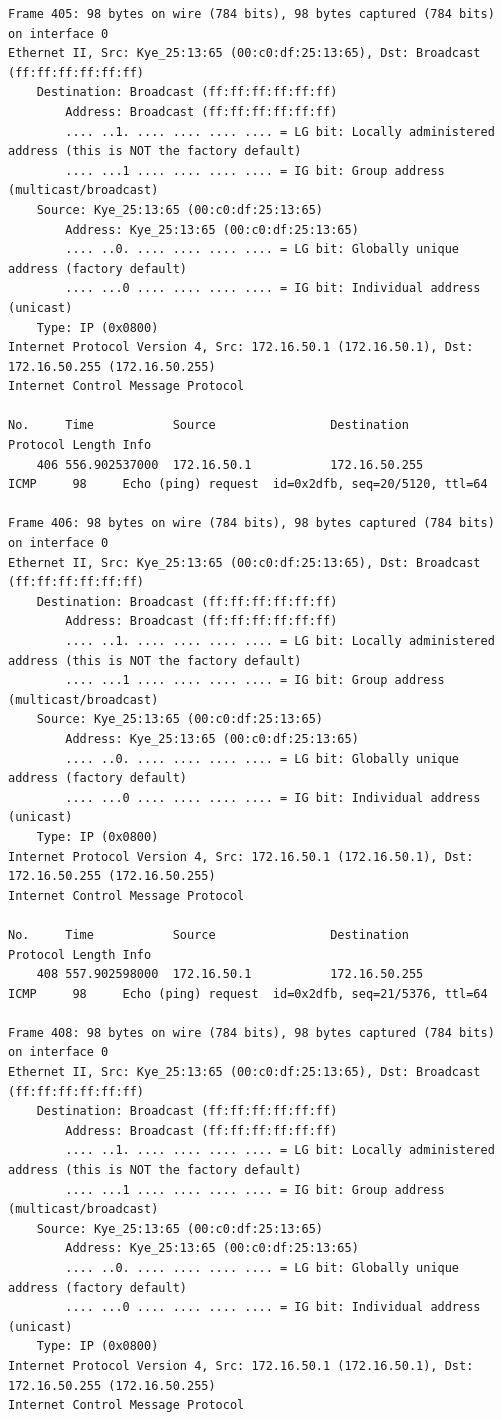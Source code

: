 \documentclass[a4paper,11pt]{article}
\begin{document}
\begin{lstlisting}
Frame 405: 98 bytes on wire (784 bits), 98 bytes captured (784 bits) on interface 0
Ethernet II, Src: Kye_25:13:65 (00:c0:df:25:13:65), Dst: Broadcast (ff:ff:ff:ff:ff:ff)
    Destination: Broadcast (ff:ff:ff:ff:ff:ff)
        Address: Broadcast (ff:ff:ff:ff:ff:ff)
        .... ..1. .... .... .... .... = LG bit: Locally administered address (this is NOT the factory default)
        .... ...1 .... .... .... .... = IG bit: Group address (multicast/broadcast)
    Source: Kye_25:13:65 (00:c0:df:25:13:65)
        Address: Kye_25:13:65 (00:c0:df:25:13:65)
        .... ..0. .... .... .... .... = LG bit: Globally unique address (factory default)
        .... ...0 .... .... .... .... = IG bit: Individual address (unicast)
    Type: IP (0x0800)
Internet Protocol Version 4, Src: 172.16.50.1 (172.16.50.1), Dst: 172.16.50.255 (172.16.50.255)
Internet Control Message Protocol

No.     Time           Source                Destination           Protocol Length Info
    406 556.902537000  172.16.50.1           172.16.50.255         ICMP     98     Echo (ping) request  id=0x2dfb, seq=20/5120, ttl=64

Frame 406: 98 bytes on wire (784 bits), 98 bytes captured (784 bits) on interface 0
Ethernet II, Src: Kye_25:13:65 (00:c0:df:25:13:65), Dst: Broadcast (ff:ff:ff:ff:ff:ff)
    Destination: Broadcast (ff:ff:ff:ff:ff:ff)
        Address: Broadcast (ff:ff:ff:ff:ff:ff)
        .... ..1. .... .... .... .... = LG bit: Locally administered address (this is NOT the factory default)
        .... ...1 .... .... .... .... = IG bit: Group address (multicast/broadcast)
    Source: Kye_25:13:65 (00:c0:df:25:13:65)
        Address: Kye_25:13:65 (00:c0:df:25:13:65)
        .... ..0. .... .... .... .... = LG bit: Globally unique address (factory default)
        .... ...0 .... .... .... .... = IG bit: Individual address (unicast)
    Type: IP (0x0800)
Internet Protocol Version 4, Src: 172.16.50.1 (172.16.50.1), Dst: 172.16.50.255 (172.16.50.255)
Internet Control Message Protocol

No.     Time           Source                Destination           Protocol Length Info
    408 557.902598000  172.16.50.1           172.16.50.255         ICMP     98     Echo (ping) request  id=0x2dfb, seq=21/5376, ttl=64

Frame 408: 98 bytes on wire (784 bits), 98 bytes captured (784 bits) on interface 0
Ethernet II, Src: Kye_25:13:65 (00:c0:df:25:13:65), Dst: Broadcast (ff:ff:ff:ff:ff:ff)
    Destination: Broadcast (ff:ff:ff:ff:ff:ff)
        Address: Broadcast (ff:ff:ff:ff:ff:ff)
        .... ..1. .... .... .... .... = LG bit: Locally administered address (this is NOT the factory default)
        .... ...1 .... .... .... .... = IG bit: Group address (multicast/broadcast)
    Source: Kye_25:13:65 (00:c0:df:25:13:65)
        Address: Kye_25:13:65 (00:c0:df:25:13:65)
        .... ..0. .... .... .... .... = LG bit: Globally unique address (factory default)
        .... ...0 .... .... .... .... = IG bit: Individual address (unicast)
    Type: IP (0x0800)
Internet Protocol Version 4, Src: 172.16.50.1 (172.16.50.1), Dst: 172.16.50.255 (172.16.50.255)
Internet Control Message Protocol


\end{lstlisting}
\end{document}
